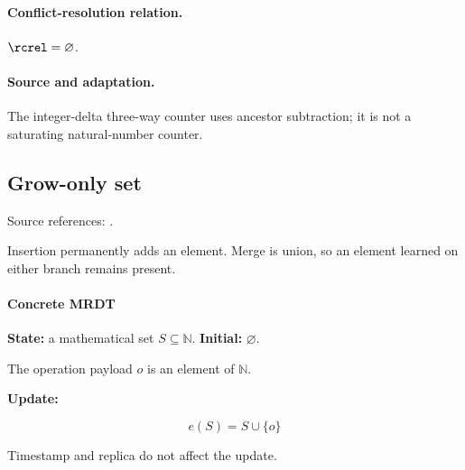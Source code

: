 \paragraph{Conflict-resolution relation.}
$\rcrel=\varnothing$.


\paragraph{Source and adaptation.}
The integer-delta three-way counter uses ancestor subtraction; it is not a saturating natural-number counter.


\subsection{Grow-only set}
\label{app:dt-grow-only-set}

\noindent Source references: \cite{shapiro2011comprehensive}.









Insertion permanently adds an element. Merge is union, so an element learned on either branch remains present.

\paragraph{Concrete MRDT}
\textbf{State:} a mathematical set $S\subseteq\mathbb{N}$. \textbf{Initial:} $\varnothing$.

The operation payload $o$ is an element of $\mathbb{N}$.

\textbf{Update:}

\[
e(S)=S\cup\{o\}
\]


Timestamp and replica do not affect the update.

